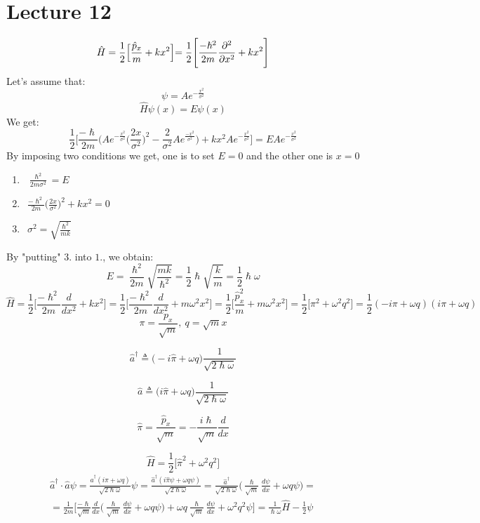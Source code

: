 \documentclass{article}
\begin{document}
\section{Lecture 12}
$$\hat{H} = \frac{1}{2} \Bigl[ \frac{\hat{p}_x}{m} + kx^2 \Bigl] = \frac{1}{2} \Biggl[ \frac{-\hslash^2}{2m} \frac{\partial^2}{\partial x^2}+ kx^2 \Biggl] $$
Let's assume that:
$$ \psi = Ae^{-\frac{x^2}{\sigma^2}}$$
$$\hat{H}\psi(x) = E\psi(x)$$
We get:
$$\frac{1}{2} \Biggl[ \frac{-\hslash}{2m} \Biggl( Ae^{-\frac{x^2}{\sigma^2}}\biggl( \frac{2x}{\sigma^2}\biggl)^2 - \frac{2}{\sigma^2} Ae^{\frac{-x^2}{\sigma^2}} \Biggl) + kx^2Ae^{-\frac{x^2}{\sigma^2}}\Biggl] = EAe^{-\frac{x^2}{\sigma^2}}$$
By imposing  two conditions we get, one is to set $E=0$ and the other one is $x=0 $
\begin{enumerate}
    \item $ \ \ \frac{\hslash^2}{2m\sigma^2} = E $
    \item $ \ \ \frac{-\hslash^2}{2m}\Biggl(\frac{2x}{\sigma^2}\Biggl)^2+ kx^2 = 0$
    \item$\ \ \sigma^2 = \sqrt{\frac{\hslash^2}{mk}}$
\end{enumerate}
By "putting" $3.$ into $1.$, we obtain:
$$E=\frac{\hslash^2}{2m}\sqrt{\frac{mk}{\hslash^2}} = \frac{1}{2}\hslash\sqrt{\frac{k}{m}} = \frac{1}{2}\hslash \omega$$
$$\hat{H} = \frac{1}{2}\Biggl[ \frac{-\hslash^2}{2m}\frac{d}{dx^2}+kx^2 \Biggl] =\frac{1}{2}\Biggl[ \frac{-\hslash^2}{2m}\frac{d}{dx^2}+m\omega^2x^2 \Biggl] = \frac{1}{2} \Biggl[ \frac{\hat{p}_x^2}{m} + m\omega^2 x^2 \Biggl] = \frac{1}{2} \Biggl[ \pi^2 + \omega^2 q^2 \Biggl] = \frac{1}{2}(-i\pi+\omega q)(i\pi+\omega q) $$
$$\pi = \frac{p_x}{\sqrt{m}},\ q = \sqrt{m}x$$


$$\hat{a}^{\dag} \triangleq \bigl( -i\hat{\pi} + \omega q \bigl) \frac{1}{\sqrt{2\hslash\omega}} $$
    
$$\hat{a} \triangleq \bigl( i\hat{\pi} + \omega q \bigl) \frac{1}{\sqrt{2\hslash\omega}} $$

$$\hat{\pi} = \frac{\hat{p}_x}{\sqrt{m}} = - \frac{i \hslash}{\sqrt{m}} \frac{d}{dx} $$

$$ \hat{H} = \frac{1}{2} \biggl[ \hat{\pi}^2 + \omega^2 q^2 \biggl]$$
\begin{align*}
\hat{a}^{\dag} \cdot \hat{a} \psi = \frac{\hat{a}^{\dag} (i\hat{\pi} + \omega q)}{\sqrt{2\hslash \omega}} \psi = \frac{\hat{a}^{\dag}(i\hat{\pi}\psi+\omega q \psi)}{\sqrt{2\hslash \omega}} = \frac{\hat{a}^{\dag}}{\sqrt{2\hslash\omega}} \Biggl( \frac{\hslash}{\sqrt{m}} \frac{d\psi}{dx} + \omega q \psi \Biggl) = \\ = \frac{1}{2m} \Biggl[ \frac{-\hslash}{\sqrt{m}} \frac{d}{dx} \Biggl( \frac{\hslash}{\sqrt{m}} \frac{d\psi}{dx} + \omega q \psi \Biggl) + \omega q \frac{\hslash}{\sqrt{m}} \frac{d\psi}{dx} + \omega^2q^2\psi\Biggl] = \frac{1}{\hslash \omega} \hat{H} -\frac{1}{2}\psi
\end{align*}
\end{document}
